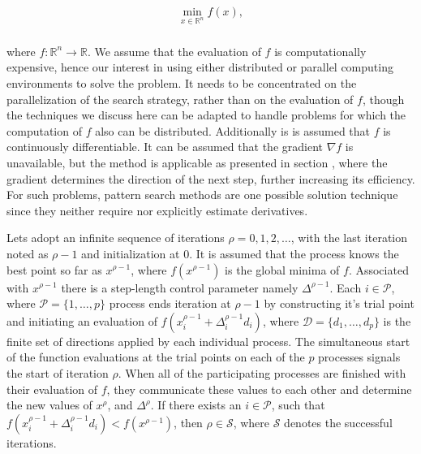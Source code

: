 {\begin{equation}
        \begin{array}{c}
            \min_{x\in\mathbb{R}^n}f(x),\\
        \end{array}
        \label{BASICCSR:eqn:currents}
    \end{equation}
		
		where $f:\mathbb{R}^n\longrightarrow\mathbb{R}$. We assume that the evaluation of $f$ is computationally expensive, hence our interest in using either distributed or parallel computing environments to solve the problem. It needs to be concentrated on the parallelization of the search strategy, rather than on the evaluation of $f$, though the techniques we discuss here can be adapted to handle problems for which the computation of $f$ also can be distributed. Additionally is is assumed that $f$ is continuously differentiable. It can be assumed that the gradient $\nabla f$ is unavailable, but the method is applicable as presented in section , where the gradient determines the direction of the next step, further increasing its efficiency. For such problems, pattern search methods are one possible solution technique since they neither require nor explicitly estimate derivatives.\\


Lets adopt an infinite sequence of iterations $\rho=0,1,2,\dots$, with the last iteration noted as $\rho-1$ and initialization at $0$. It is assumed that the process knows the best point so far as $x^{\rho-1}$, where $f(x^{\rho-1})$ is the global minima of $f$. Associated with $x^{\rho-1}$ there is a step-length control parameter namely $\Delta^{\rho-1}$. Each $i\in\mathcal{P}$, where $\mathcal{P}=\{1,\dots,p\}$ process ends iteration at $\rho-1$ by constructing it's trial point and initiating an evaluation of $f(x^{\rho-1}_i+\Delta^{\rho-1}_id_i)$, where $\mathcal{D}=\{d_1,\dots,d_p\}$ is the finite set of directions applied by each individual process. The simultaneous start of the function evaluations at the trial points on each of the $p$ processes signals the start of iteration $\rho$. When all of the participating processes are finished with their evaluation of $f$, they communicate these values to each other and determine the new values of $x^\rho$, and $\Delta^\rho$. If there exists an $i\in\mathcal{P}$, such that $f(x^{\rho-1}_i+\Delta^{\rho-1}_id_i)<f(x^{\rho-1})$, then $\rho\in\mathcal{S}$, where $\mathcal{S}$ denotes the successful iterations.

}
